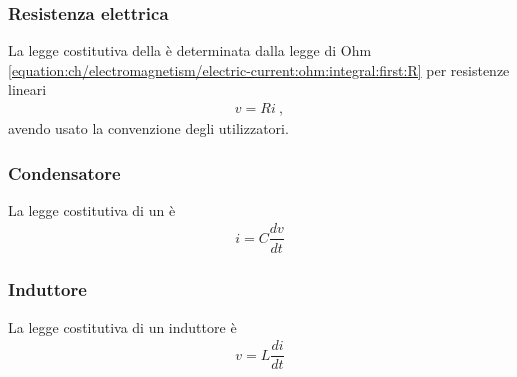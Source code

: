 \documentclass[letterpaper,10pt,italian]{jupyterBook}
\begin{document}
\subsubsection{Resistenza elettrica}
\label{\detokenize{ch/electromagnetism/circuits-electric:resistenza-elettrica}}\label{\detokenize{ch/electromagnetism/circuits-electric:physics-hs-electromagnetism-circuits-electric-components-resistor}}
\sphinxAtStartPar
La legge costitutiva della {\hyperref[\detokenize{ch/electromagnetism/electric-current:physics-hs-electromagnetism-electric-current-solids-conductor-ohm}]{}} è determinata dalla legge di Ohm \eqref{equation:ch/electromagnetism/electric-current:ohm:integral:first:R} per resistenze lineari
\begin{equation*}
\begin{split}v = R i \ ,\end{split}
\end{equation*}
\sphinxAtStartPar
avendo usato la convenzione degli utilizzatori.


\subsubsection{Condensatore}
\label{\detokenize{ch/electromagnetism/circuits-electric:condensatore}}\label{\detokenize{ch/electromagnetism/circuits-electric:physics-hs-electromagnetism-circuits-electric-components-capacitor}}
\sphinxAtStartPar
La legge costitutiva di un {\hyperref[\detokenize{ch/electromagnetism/electrostatics:physics-hs-electromagnetism-electrostatics-capacitor}]{}} è
\begin{equation*}
\begin{split}i = C \dfrac{d v}{dt}\end{split}
\end{equation*}

\subsubsection{Induttore}
\label{\detokenize{ch/electromagnetism/circuits-electric:induttore}}\label{\detokenize{ch/electromagnetism/circuits-electric:physics-hs-electromagnetism-circuits-electric-components-inductor}}
\sphinxAtStartPar
La legge costitutiva di un induttore è
\begin{equation*}
\begin{split}v = L \dfrac{d i}{dt}\end{split}
\end{equation*}
\end{document}
